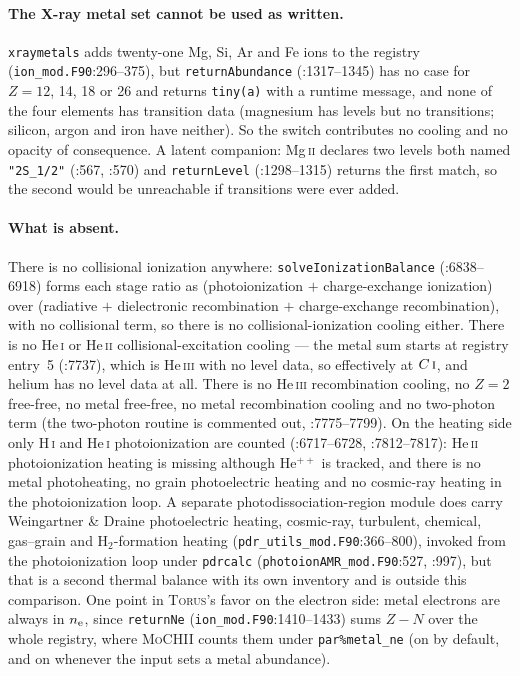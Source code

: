 \documentclass[english,a4paper]{my_memo}
\newcommand{\code}[1]{\texttt{#1}}
\newcommand{\MoCHII}{\textsc{MoCHII}}
\newcommand{\Torus}{\textsc{Torus}}
\newcommand{\HI}{H\,\textsc{i}}
\newcommand{\HeI}{He\,\textsc{i}}
\newcommand{\HeII}{He\,\textsc{ii}}
\newcommand{\HeIII}{He\,\textsc{iii}}
\newcommand{\CI}{C\,\textsc{i}}
\newcommand{\nel}{n_{\rm e}}
\begin{document}
\paragraph{The X-ray metal set cannot be used as written.}  \code{xraymetals}
adds twenty-one Mg, Si, Ar and Fe ions to the registry
(\code{ion\_mod.F90}:296--375), but \code{returnAbundance} (:1317--1345) has no
case for $Z = 12$, 14, 18 or 26 and returns \code{tiny(a)} with a runtime
message, and none of the four elements has transition data (magnesium has
levels but no transitions; silicon, argon and iron have neither).  So the
switch contributes no cooling and no opacity of consequence.  A latent
companion: Mg\,\textsc{ii} declares two levels both named \code{"2S\_1/2"}
(:567, :570) and \code{returnLevel} (:1298--1315) returns the first match, so
the second would be unreachable if transitions were ever added.

\paragraph{What is absent.}  There is no collisional ionization anywhere:
\code{solveIonizationBalance} (:6838--6918) forms each stage ratio as
(photoionization $+$ charge-exchange ionization) over (radiative $+$
dielectronic recombination $+$ charge-exchange recombination), with no
collisional term, so there is no collisional-ionization cooling either.  There
is no \HeI{} or \HeII{} collisional-excitation cooling --- the metal sum starts
at registry entry~5 (:7737), which is \HeIII{} with no level data, so
effectively at $\CI{}$, and helium has no level data at all.  There is no
\HeIII{} recombination cooling, no $Z = 2$ free-free, no metal free-free, no
metal recombination cooling and no two-photon term (the two-photon routine is
commented out, :7775--7799).  On the heating side only \HI{} and \HeI{}
photoionization are counted (:6717--6728, :7812--7817): \HeII{} photoionization
heating is missing although He$^{++}$ is tracked, and there is no metal
photoheating, no grain photoelectric heating and no cosmic-ray heating in the
photoionization loop.  A separate photodissociation-region module does carry
Weingartner \& Draine photoelectric heating, cosmic-ray, turbulent, chemical,
gas--grain and H$_2$-formation heating (\code{pdr\_utils\_mod.F90}:366--800),
invoked from the photoionization loop under \code{pdrcalc}
(\code{photoionAMR\_mod.F90}:527, :997), but that is a second thermal balance
with its own inventory and is outside this comparison.  One point in
\Torus{}'s favor on the electron side: metal electrons are always in $\nel$,
since \code{returnNe} (\code{ion\_mod.F90}:1410--1433) sums $Z - N$ over the
whole registry, where \MoCHII{} counts them under \code{par\%metal\_ne}
(on by default, and on whenever the input sets a metal abundance).
\end{document}

